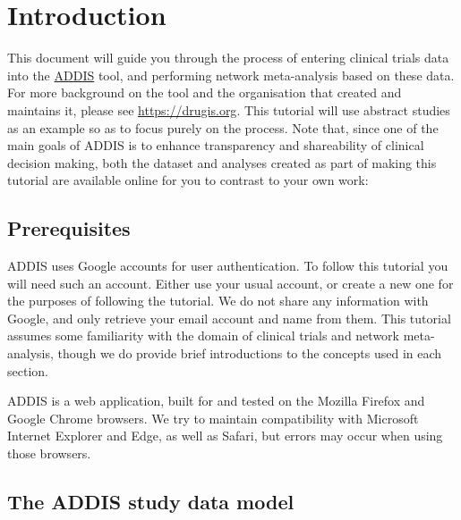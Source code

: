 \documentclass[12pt]{article}
\begin{document}
\maketitle

\tableofcontents

\section{Introduction}

This document will guide you through the process of entering clinical trials data into the \href{https://addis.drugis.org}{ADDIS} tool, and performing network meta-analysis based on these data.
For more background on the tool and the organisation that created and maintains it, please see \href{https://drugis.org}{https://drugis.org}.
This tutorial will use abstract studies as an example so as to focus purely on the process.
Note that, since one of the main goals of ADDIS is to enhance transparency and shareability of clinical decision making, both the dataset and analyses created as part of making this tutorial are available online for you to contrast to your own work:

\subsection{Prerequisites}

ADDIS uses Google accounts for user authentication.
To follow this tutorial you will need such an account.
Either use your usual account, or create a new one for the purposes of following the tutorial.
We do not share any information with Google, and only retrieve your email account and name from them.
This tutorial assumes some familiarity with the domain of clinical trials and network meta-analysis, though we do provide brief introductions to the concepts used in each section.

ADDIS is a web application, built for and tested on the Mozilla Firefox and Google Chrome browsers.
We try to maintain compatibility with Microsoft Internet Explorer and Edge, as well as Safari, but errors may occur when using those browsers.

\subsection{The ADDIS study data model}
\end{document}
